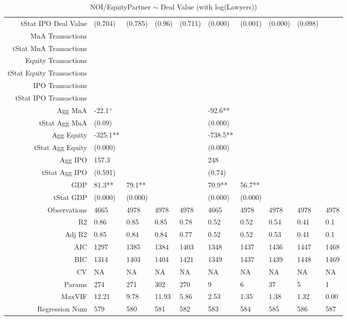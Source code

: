\begin{table}[ht]
\begin{tabular}{rlllllllll}
  tStat IPO Deal Value & (0.704) & (0.785) & (0.96) & (0.711) & (0.000) & (0.001) & (0.000) & (0.098) &  \\ 
  MnA Transactions &  &  &  &  &  &  &  &  &  \\ 
  tStat MnA Transactions &  &  &  &  &  &  &  &  &  \\ 
  Equity Transactions &  &  &  &  &  &  &  &  &  \\ 
  tStat Equity Transactions &  &  &  &  &  &  &  &  &  \\ 
  IPO Transactions &  &  &  &  &  &  &  &  &  \\ 
  tStat IPO Transactions &  &  &  &  &  &  &  &  &  \\ 
  Agg MnA & -22.1$^{+}$ &  &  &  & -92.6** &  &  &  &  \\ 
  tStat Agg MnA & (0.09) &  &  &  & (0.000) &  &  &  &  \\ 
  Agg Equity & -325.1** &  &  &  & -738.5** &  &  &  &  \\ 
  tStat Agg Equity & (0.000) &  &  &  & (0.000) &  &  &  &  \\ 
  Agg IPO & 157.3 &  &  &  & 248 &  &  &  &  \\ 
  tStat Agg IPO & (0.591) &  &  &  & (0.74) &  &  &  &  \\ 
  GDP & 81.3** & 79.1** &  &  & 70.9** & 56.7** &  &  &  \\ 
  tStat GDP & (0.000) & (0.000) &  &  & (0.000) & (0.000) &  &  &  \\ 
  Observations & 4665 & 4978 & 4978 & 4978 & 4665 & 4978 & 4978 & 4978 & 4978 \\ 
  R2 & 0.86 & 0.85 & 0.85 & 0.78 & 0.52 & 0.52 & 0.54 & 0.41 & 0.1 \\ 
  Adj R2 & 0.85 & 0.84 & 0.84 & 0.77 & 0.52 & 0.52 & 0.53 & 0.41 & 0.1 \\ 
  AIC & 1297 & 1385 & 1384 & 1403 & 1348 & 1437 & 1436 & 1447 & 1468 \\ 
  BIC & 1314 & 1403 & 1404 & 1421 & 1349 & 1437 & 1439 & 1448 & 1469 \\ 
  CV & NA & NA & NA & NA & NA & NA & NA & NA & NA \\ 
  Params & 274 & 271 & 302 & 270 & 9 & 6 & 37 & 5 & 1 \\ 
  MaxVIF & 12.21 & 9.78 & 11.93 & 5.86 & 2.53 & 1.35 & 1.38 & 1.32 & 0.00 \\ 
  Regression Num & 579 & 580 & 581 & 582 & 583 & 584 & 585 & 586 & 587 \\ 
   \hline
\end{tabular}
\caption{NOI/EquityPartner $\sim$ Deal Value (with log(Lawyers))} 
\end{table}
